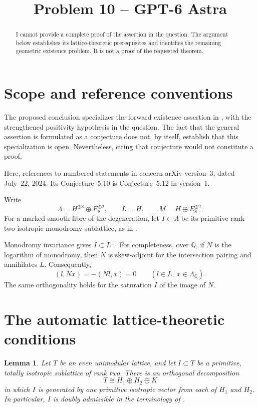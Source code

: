 \documentclass[11pt]{amsart}
\title{Problem 10 -- GPT-6 Astra}
\author{}
\date{}
\newcommand{\Q}{\mathbb Q}
\newtheorem{lemma}{Lemma}[section]
\theoremstyle{remark}
\begin{document}
\maketitle

\begin{abstract}
I cannot provide a complete proof of the assertion in the question.
The argument below establishes its lattice-theoretic prerequisites and
identifies the remaining geometric existence problem.  It is not a proof
of the requested theorem.
\end{abstract}

\section{Scope and reference conventions}

The proposed conclusion specializes the forward existence assertion in
\cite[Conjecture~5.10]{GT24}, with the strengthened positivity hypothesis
in the question.
The fact that the general assertion is formulated as a conjecture does
not, by itself, establish that this specialization is open.
Nevertheless, citing that conjecture would not constitute a proof.

Here, references to numbered statements in \cite{GT24} concern
arXiv version~3, dated July~22, 2024.  Its Conjecture~5.10 is
Conjecture~5.12 in version~1.

Write
\[
 \Lambda=H^{\oplus 3}\oplus E_8^{\oplus 2},
 \qquad L=H,
 \qquad M=H\oplus E_8^{\oplus 2}.
\]
For a marked smooth fibre of the degeneration, let
\(I\subset\Lambda\) be its primitive rank-two isotropic monodromy
sublattice, as in \cite[Section~3.1]{GT24}.

Monodromy invariance gives \(I\subset L^\perp\).
For completeness, over \(\Q\), if \(N\) is the logarithm of monodromy,
then \(N\) is skew-adjoint for the intersection pairing and annihilates
\(L\).  Consequently,
\[
 (l,Nx)=-(Nl,x)=0
 \qquad(l\in L,\ x\in\Lambda_\Q).
\]
The same orthogonality holds for the saturation \(I\) of the image of
\(N\).

\section{The automatic lattice-theoretic conditions}

\begin{lemma}\label{lem:split}
Let \(T\) be an even unimodular lattice, and let
\(I\subset T\) be a primitive, totally isotropic sublattice of rank two.
There is an orthogonal decomposition
\[
 T\cong H_1\oplus H_2\oplus K
\]
in which \(I\) is generated by one primitive isotropic vector from each
of \(H_1\) and \(H_2\).
In particular, \(I\) is doubly admissible in the terminology of
\cite[Definition~3.31]{GT24}.
\end{lemma}
\end{document}
